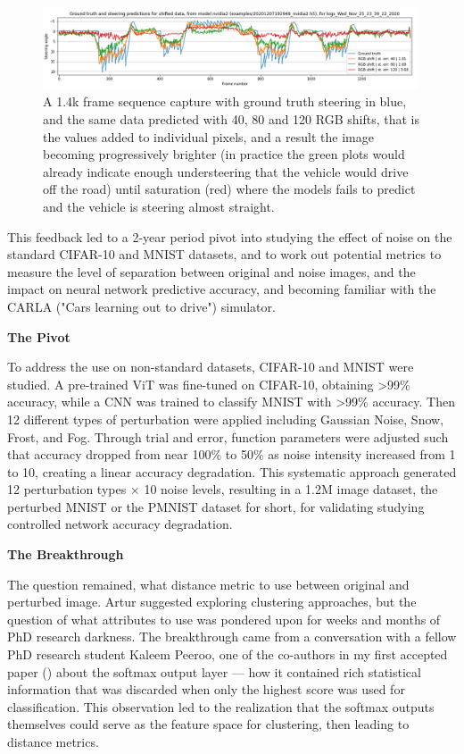 \begin{figure}[h]
\centering
\includegraphics[width=0.99\textwidth]{Figures/Methods/dataShiftedSteeringPredictions-p40p80p120.png}
\caption{A 1.4k frame sequence capture with ground truth steering in blue, and the same data predicted with 40, 80 and 120 RGB shifts, that is the values added to individual pixels, and a result the image becoming progressively brighter (in practice the green plots would already indicate enough understeering that the vehicle would drive off the road) until saturation (red) where the models fails to predict and the vehicle is steering almost straight.}
\label{fig:dataShiftedSteeringPredictions-p40p80p120}
\end{figure}

This feedback led to a 2-year period pivot into studying the effect of noise on the standard CIFAR-10 and MNIST datasets, and to work out potential metrics to measure the level of separation between original and noise images, and the impact on neural network predictive accuracy, and becoming familiar with the CARLA ("Cars learning out to drive") simulator.

\textbf{The Pivot}

To address the use on non-standard datasets, CIFAR-10 and MNIST were studied. A pre-trained ViT \cite{google2021vitbasepatch16224} was fine-tuned on CIFAR-10, obtaining >99\% accuracy, while a CNN was trained to classify MNIST with >99\% accuracy. Then 12 different types of perturbation were applied including Gaussian Noise, Snow, Frost, and Fog. Through trial and error, function parameters were adjusted such that accuracy dropped from near 100\% to 50\% as noise intensity increased from 1 to 10, creating a linear accuracy degradation. This systematic approach generated 12 perturbation types × 10 noise levels, resulting in a 1.2M image dataset, the perturbed MNIST or the PMNIST dataset for short, for validating studying controlled network accuracy degradation.

\textbf{The Breakthrough}

The question remained, what distance metric to use between original and perturbed image. Artur suggested exploring clustering approaches, but the question of what attributes to use was pondered upon for weeks and months of PhD research darkness. The breakthrough came from a conversation with a fellow PhD research student Kaleem Peeroo, one of the co-authors in my first accepted paper (\cite{sikar2024misclassificationlikelihoodmatrixclasses}) about the softmax output layer — how it contained rich statistical information that was discarded when only the highest score was used for classification. This observation led to the realization that the softmax outputs themselves could serve as the feature space for clustering, then leading to distance metrics.

